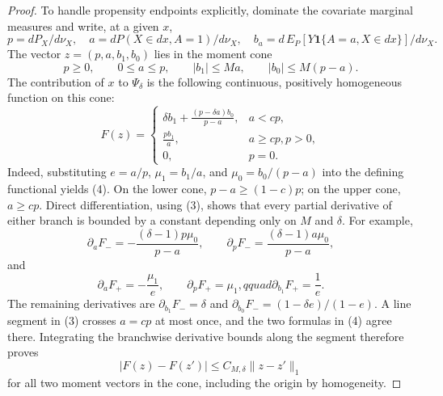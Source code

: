 \documentclass{article}
\begin{document}
\begin{proof}
To handle propensity endpoints explicitly, dominate the covariate marginal measures and write, at a given \(x\),
\begin{equation}
 p=dP_X/d\nu_X,\quad a=dP(X\in dx,A=1)/d\nu_X,\quad
 b_a=d\,E_P[Y\mathbf 1\{A=a,X\in dx\}]/d\nu_X.
\end{equation}
The vector \(z=(p,a,b_1,b_0)\) lies in the moment cone
\begin{equation}
 p\ge0,\qquad 0\le a\le p,\qquad |b_1|\le Ma,\qquad |b_0|\le M(p-a).                    \tag{3}
\end{equation}
The contribution of \(x\) to \(\Psi_\delta\) is the following continuous, positively homogeneous function on this cone:
\begin{equation}
 F(z)=
 \begin{cases}
 \displaystyle \delta b_1+\frac{(p-\delta a)b_0}{p-a},&a<cp,\\[6pt]
 \displaystyle \frac{pb_1}{a},&a\ge cp, p>0,\\[4pt]
 0,&p=0.
 \end{cases}                                                                            \tag{4}
\end{equation}
Indeed, substituting \(e=a/p\), \(\mu _1=b_1/a\), and \(\mu _0=b_0/(p-a)\) into the defining functional yields (4).  On the lower cone, \(p-a\ge(1-c)p\); on the upper cone, \(a\ge cp\).  Direct differentiation, using (3), shows that every partial derivative of either branch is bounded by a constant depending only on \(M\) and \(\delta\).  For example,
\begin{equation}
 \partial_aF_-=-\frac{(\delta-1)p\mu _0}{p-a},\qquad
 \partial_pF_-=\frac{(\delta-1)a\mu _0}{p-a},
\end{equation}
and
\begin{equation}
 \partial_aF_+=-\frac{\mu _1}{e},\qquad \partial_pF_+=\mu _1,qquad
 \partial_{b_1}F_+=\frac1e.
\end{equation}
The remaining derivatives are \(\partial_{b_1}F_-=\delta\) and
\(\partial_{b_0}F_-=(1-\delta e)/(1-e)\).  A line segment in (3) crosses \(a=cp\) at most once, and the two formulas in (4) agree there.  Integrating the branchwise derivative bounds along the segment therefore proves
\begin{equation}
 |F(z)-F(z')|\le C_{M,\delta}\|z-z'\|_1                                                 \tag{5}
\end{equation}
for all two moment vectors in the cone, including the origin by homogeneity.


\end{proof}
\end{document}
